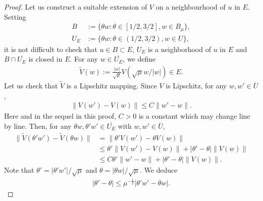 \documentclass[10pt,a4paper]{amsart}
\begin{document}
\begin{proof}
	
	Let us construct a suitable extension of $V$ on a neighbourhood of $u$ in $E$. Setting
	\begin{align*}
		B & := \bigl\{\theta w: \theta \in [1/2,3/2], w \in B_\mu\bigr\}, \\
		U_E & := \bigl\{\theta w: \theta \in (1/2,3/2), w \in U\bigr\},
	\end{align*}
    it is not difficult to check that $u \in B \subset E$, $U_E$ is a neighborhood of $u$ in $E$ and $B \cap \overline{U_E}$ is closed in $E$. For any $w \in \overline{U_E}$, we define
    \begin{align*}
    	\widetilde V(w) := \frac{|w|}{\sqrt \mu}V(\sqrt \mu w/|w|) \in E.
    \end{align*}
    Let us check that $\widetilde{V}$ is a Lipschitz mapping. Since $V$ is Lipschitz, for any $w, w' \in \overline{U}$,
    \begin{align*}
    	\|V(w')-V(w)\| \leq C\|w'-w\|.
    \end{align*}
    Here and in the sequel in this proof, $C > 0$ is a constant which may change line by line. Then, for any $\theta w, \theta'w' \in \overline{U_E}$ with $w, w' \in \overline{U}$,
    \begin{align*}
    	\|\widetilde{V}(\theta'w') - \widetilde{V}(\theta w)\| &
    	= \|\theta'V(w') - \theta V(w)\| \\
    	& \leq \theta'\|V(w')-V(w)\| + |\theta'-\theta|\|V(w)\| \\
    	& \leq C\theta'\|w'-w\| + |\theta'-\theta |\|V(w)\|. 
    \end{align*}
    Note that $\theta' = |\theta'w'|/\sqrt{\mu}$ and $\theta  = |\theta w|/\sqrt{\mu}$. We deduce
    \begin{align*}
    	|\theta'-\theta| \leq \mu^{-\frac12}|\theta'w'-\theta w|.
    \end{align*}

\end{proof}
\end{document}
